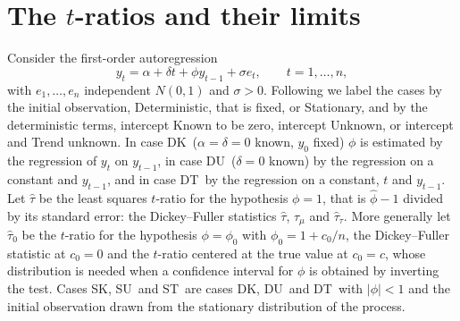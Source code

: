 \documentclass[ecta,nameyear,final]{econsocart}
\newcommand{\phih}{\hat\phi}
\newcommand{\tauh}{\hat\tau}
\newcommand{\Fk}{\textsf{\upshape DK}}
\newcommand{\Fu}{\textsf{\upshape DU}}
\newcommand{\Ft}{\textsf{\upshape DT}}
\newcommand{\Sk}{\textsf{\upshape SK}}
\newcommand{\Su}{\textsf{\upshape SU}}
\newcommand{\St}{\textsf{\upshape ST}}
\theoremstyle{plain}
\theoremstyle{definition}
\begin{document}
\section{The $t$-ratios and their limits}
\label{sec:model}

Consider the first-order autoregression
\begin{equation}
y_t=\alpha+\delta t+\phi y_{t-1}+\sigma e_t,\qquad t=1,\ldots,n,
\label{eq:ar1}
\end{equation}
with $e_1,\ldots,e_n$ independent $N(0,1)$ and $\sigma>0$.  Following \cite{BaoKan2026} we label the cases by the initial observation, \textsf{D}eterministic, that is fixed, or \textsf{S}tationary, and by the deterministic terms, intercept \textsf{K}nown to be zero, intercept \textsf{U}nknown, or intercept and \textsf{T}rend unknown.  In case \Fk\ ($\alpha=\delta=0$ known, $y_0$ fixed) $\phi$ is estimated by the regression of $y_t$ on $y_{t-1}$, in case \Fu\ ($\delta=0$ known) by the regression on a constant and $y_{t-1}$, and in case \Ft\ by the regression on a constant, $t$ and $y_{t-1}$.  Let $\tauh$ be the least squares $t$-ratio for the hypothesis $\phi=1$, that is $\phih-1$ divided by its standard error: the Dickey--Fuller statistics $\hat\tau$, $\hat\tau_\mu$ and $\hat\tau_\tau$.  More generally let $\tauh_0$ be the $t$-ratio for the hypothesis $\phi=\phi_0$ with $\phi_0=1+c_0/n$, the Dickey--Fuller statistic at $c_0=0$ and the $t$-ratio centered at the true value at $c_0=c$, whose distribution is needed when a confidence interval for $\phi$ is obtained by inverting the test.  Cases \Sk, \Su\ and \St\ are cases \Fk, \Fu\ and \Ft\ with $|\phi|<1$ and the initial observation drawn from the stationary distribution of the process.
\end{document}
